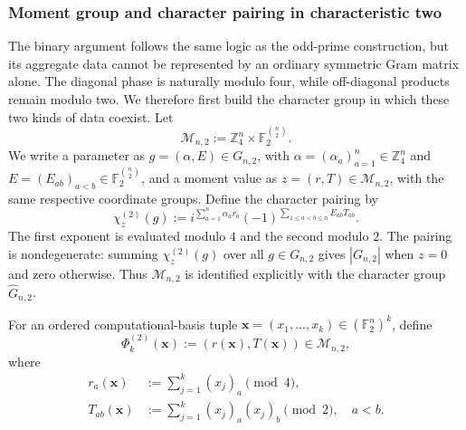 \documentclass[11pt]{article}
\newcommand{\F}{\mathbb F}
\newcommand{\1}{\mathbf 1}
\theoremstyle{plain}
\theoremstyle{definition}
\theoremstyle{remark}
\begin{document}
\subsubsection{Moment group and character pairing in characteristic two}
The binary argument follows the same logic as the odd-prime construction, but its aggregate data cannot be represented by an ordinary symmetric Gram matrix alone.  The diagonal phase is naturally modulo four, while off-diagonal products remain modulo two.  We therefore first build the character group in which these two kinds of data coexist.  Let
\begin{equation}
 \mathcal M_{n,2}:=\mathbb Z_4^n\times
 \F_2^{\binom n2}.
 \label{eq:binary-enhanced-moment-group}
\end{equation}
We write a parameter as $g=(\alpha,E)\in G_{n,2}$, with
$\alpha=(\alpha_a)_{a=1}^n\in\mathbb Z_4^n$ and
$E=(E_{ab})_{a<b}\in\F_2^{\binom n2}$, and a moment value as
$z=(r,T)\in\mathcal M_{n,2}$, with the same respective coordinate groups.
Define the character pairing by
\begin{equation}
 \chi_z^{(2)}(g)
 :=i^{\sum_{a=1}^n\alpha_a r_a}
   (-1)^{\sum_{1\le a<b\le n}E_{ab}T_{ab}}.
 \label{eq:binary-enhanced-character-pairing}
\end{equation}
The first exponent is evaluated modulo $4$ and the second modulo $2$.
The pairing is nondegenerate: summing $\chi_z^{(2)}(g)$ over all
$g\in G_{n,2}$ gives $|G_{n,2}|$ when $z=0$ and zero otherwise.
Thus $\mathcal M_{n,2}$ is identified explicitly with the character group
$\widehat G_{n,2}$.

For an ordered computational-basis tuple
$\boldsymbol x=(x_1,\ldots,x_k)\in(\F_2^n)^k$, define
\begin{equation}
 \Phi_k^{(2)}(\boldsymbol x):=(r(\boldsymbol x),T(\boldsymbol x))
 \in\mathcal M_{n,2},
 \label{eq:integrated-qubit-moment-map}
\end{equation}
where
\begin{align}
 r_a(\boldsymbol x)&:=\sum_{j=1}^k(x_j)_a\pmod4,
 \label{eq:integrated-qubit-linear-moment}\\
 T_{ab}(\boldsymbol x)&:=\sum_{j=1}^k(x_j)_a(x_j)_b\pmod2,
 \quad a<b.
 \label{eq:integrated-qubit-edge-moment}
\end{align}
\end{document}
